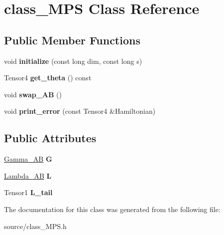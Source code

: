 \hypertarget{classclass___m_p_s}{}\section{class\+\_\+\+M\+PS Class Reference}
\label{classclass___m_p_s}
\subsection*{Public Member Functions}
\begin{DoxyCompactItemize}
\item 
void {\bfseries initialize} (const long dim, const long s)\hypertarget{classclass___m_p_s_a89e3fc0278d754e30c0d45e3febd2970}{}\label{classclass___m_p_s_a89e3fc0278d754e30c0d45e3febd2970}

\item 
Tensor4 {\bfseries get\+\_\+theta} () const \hypertarget{classclass___m_p_s_a931bb52a82a9483434ea8ee3dbfc4b97}{}\label{classclass___m_p_s_a931bb52a82a9483434ea8ee3dbfc4b97}

\item 
void {\bfseries swap\+\_\+\+AB} ()\hypertarget{classclass___m_p_s_a27502b59d10647f0037b71e148654d65}{}\label{classclass___m_p_s_a27502b59d10647f0037b71e148654d65}

\item 
void {\bfseries print\+\_\+error} (const Tensor4 \&Hamiltonian)\hypertarget{classclass___m_p_s_ac97a829a430419d2f3fe23af6c69b3e1}{}\label{classclass___m_p_s_ac97a829a430419d2f3fe23af6c69b3e1}

\end{DoxyCompactItemize}
\subsection*{Public Attributes}
\begin{DoxyCompactItemize}
\item 
\hyperlink{class_gamma___a_b}{Gamma\+\_\+\+AB} {\bfseries G}\hypertarget{classclass___m_p_s_a5a84e65044090e169ea145d771bea2db}{}\label{classclass___m_p_s_a5a84e65044090e169ea145d771bea2db}

\item 
\hyperlink{class_lambda___a_b}{Lambda\+\_\+\+AB} {\bfseries L}\hypertarget{classclass___m_p_s_a58a6db207f26d776ce01ab0ced820e36}{}\label{classclass___m_p_s_a58a6db207f26d776ce01ab0ced820e36}

\item 
Tensor1 {\bfseries L\+\_\+tail}\hypertarget{classclass___m_p_s_a1f3141591083861a11e7707a96f7284c}{}\label{classclass___m_p_s_a1f3141591083861a11e7707a96f7284c}

\end{DoxyCompactItemize}


The documentation for this class was generated from the following file\+:\begin{DoxyCompactItemize}
\item 
source/class\+\_\+\+M\+P\+S.\+h\end{DoxyCompactItemize}
